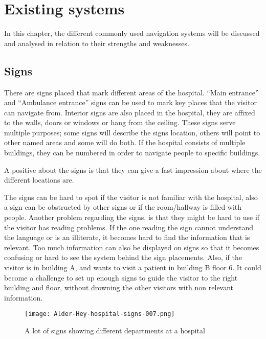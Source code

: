\section{Existing systems} %
\label{sec:existing_systems}
In this chapter, the different commonly used navigation systems will be discussed and analysed in relation to their strengths and weaknesses.

\subsection{Signs}
There are signs placed that mark different areas of the hospital. \enquote{Main entrance} and \enquote{Ambulance entrance}\cite{signs_hospital} signs can be used to mark key places that the visitor can navigate from\cite{art_Osborne}.
Interior signs are also placed in the hospital, they are affixed to the walls, doors or windows or hang from the ceiling. These signs serve multiple purposes; some signs will describe the signs location, others will point to other named areas and some will do both. 
If the hospital consists of multiple buildings, they can be numbered in order to navigate people to specific buildings.

A positive about the signs is that they can give a fast impression about where the different locations are.

The signs can be hard to spot if the  visitor is not familiar with the hospital, also a sign can be obstructed by other signs or if the room/hallway is filled with people. Another problem regarding the signs, is that they might be hard to use if the visitor has reading problems. If the one reading the sign cannot understand the language or is an illiterate, it becomes hard to find the information that is relevant\cite{signs_reading}. Too much information can also be displayed on signs so that it becomes confusing or hard to see the system behind the sign placements.
Also, if the visitor is in building A, and wants to visit a patient in building B floor 6. It could become a challenge to set up enough signs to guide the visitor to the right building and floor, without drowning the other visitors with non relevant information.

  \begin{figure}[ht!]
    \centering
    \texttt{[image: Alder-Hey-hospital-signs-007.png]}
    \caption{A lot of signs showing different departments at a hospital\cite{signs_hospital}}
    \label{overflow}
  \end{figure}

